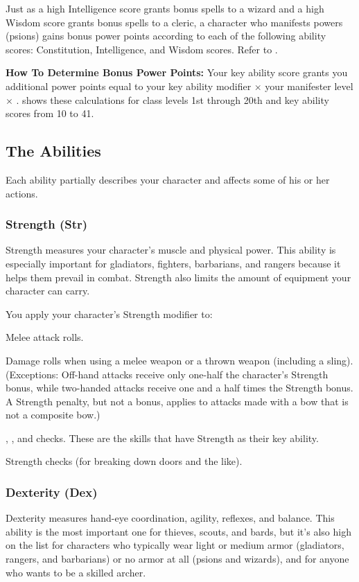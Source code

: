 Just as a high Intelligence score grants bonus spells to a wizard and a high Wisdom score grants bonus spells to a cleric, a character who manifests powers (psions) gains bonus power points according to each of the following ability scores: Constitution, Intelligence, and Wisdom scores. Refer to .

\textbf{How To Determine Bonus Power Points:} Your key ability score grants you additional power points equal to your key ability modifier $\times$ your manifester level $\times$ \onehalf.  shows these calculations for class levels 1st through 20th and key ability scores from 10 to 41.


\subsection{The Abilities}
Each ability partially describes your character and affects some of his or her actions.

\subsubsection{Strength (Str)}
Strength measures your character's muscle and physical power. This ability is especially important for gladiators, fighters, barbarians, and rangers because it helps them prevail in combat. Strength also limits the amount of equipment your character can carry.

You apply your character's Strength modifier to:
\begin{itemize*}
\item Melee attack rolls.
\item Damage rolls when using a melee weapon or a thrown weapon (including a sling). (Exceptions: Off-hand attacks receive only one-half the character's Strength bonus, while two-handed attacks receive one and a half times the Strength bonus. A Strength penalty, but not a bonus, applies to attacks made with a bow that is not a composite bow.)
\item {}, , and  checks. These are the skills that have Strength as their key ability.
\item Strength checks (for breaking down doors and the like).
\end{itemize*}

\subsubsection{Dexterity (Dex)}
Dexterity measures hand-eye coordination, agility, reflexes, and balance. This ability is the most important one for thieves, scouts, and bards, but it's also high on the list for characters who typically wear light or medium armor (gladiators, rangers, and barbarians) or no armor at all (psions and wizards), and for anyone who wants to be a skilled archer.

